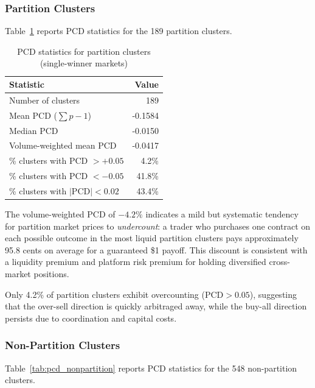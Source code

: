 \documentclass[12pt,a4paper]{article}
\theoremstyle{definition}
\theoremstyle{remark}
\newcommand{\PCD}{\mathrm{PCD}}
\begin{document}
\subsubsection{Partition Clusters}

Table~\ref{tab:pcd_partition} reports PCD statistics for the 189 partition
clusters.

\begin{table}[H]
\centering
\caption{PCD statistics for partition clusters (single-winner markets)}
\label{tab:pcd_partition}
\begin{tabular}{lr}
\toprule
\textbf{Statistic} & {\textbf{Value}} \\
\midrule
Number of clusters                    & 189 \\
Mean PCD ($\sum p - 1$)               & -0.1584 \\
Median PCD                            & -0.0150 \\
Volume-weighted mean PCD              & -0.0417 \\
\midrule
\% clusters with PCD $> +0.05$        & 4.2\% \\
\% clusters with PCD $< -0.05$        & 41.8\% \\
\% clusters with $|\text{PCD}| < 0.02$& 43.4\% \\
\bottomrule
\end{tabular}
\end{table}

The volume-weighted PCD of $-4.2\%$ indicates a mild but systematic
tendency for partition market prices to \emph{undercount}: a trader who
purchases one contract on each possible outcome in the most liquid partition
clusters pays approximately 95.8 cents on average for a guaranteed \$1
payoff.
This discount is consistent with a liquidity premium and platform risk
premium for holding diversified cross-market positions.

Only 4.2\% of partition clusters exhibit overcounting ($\PCD > 0.05$),
suggesting that the over-sell direction is quickly arbitraged away,
while the buy-all direction persists due to coordination and capital costs.

\subsubsection{Non-Partition Clusters}

Table~\ref{tab:pcd_nonpartition} reports PCD statistics for the 548
non-partition clusters.
\end{document}

